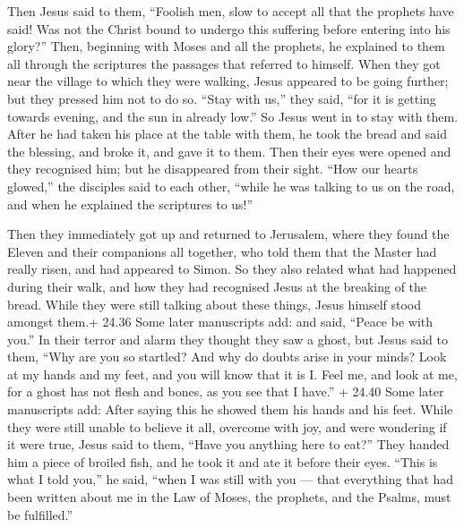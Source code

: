  Then Jesus said to them, ``Foolish men, slow to accept all
that the prophets have said!  Was not the Christ bound to
undergo this suffering before entering into his glory?'' 
Then, beginning with Moses and all the prophets, he explained to them
all through the scriptures the passages that referred to himself.
 When they got near the village to which they were walking,
Jesus appeared to be going further;  but they pressed him
not to do so. ``Stay with us,'' they said, ``for it is getting towards
evening, and the sun in already low.'' So Jesus went in to stay with
them.  After he had taken his place at the table with them,
he took the bread and said the blessing, and broke it, and gave it to
them.  Then their eyes were opened and they recognised him;
but he disappeared from their sight.  ``How our hearts
glowed,'' the disciples said to each other, ``while he was talking to us
on the road, and when he explained the scriptures to us!''

 Then they immediately got up and returned to Jerusalem,
where they found the Eleven and their companions all together,
 who told them that the Master had really risen, and had
appeared to Simon.  So they also related what had happened
during their walk, and how they had recognised Jesus at the breaking of
the bread.  While they were still talking about these
things, Jesus himself stood amongst them.+ 24.36 Some later manuscripts
add: and said, ``Peace be with you.''  In their terror and
alarm they thought they saw a ghost,  but Jesus said to
them, ``Why are you so startled? And why do doubts arise in your minds?
 Look at my hands and my feet, and you will know that it is
I. Feel me, and look at me, for a ghost has not flesh and bones, as you
see that I have.''  + 24.40 Some later manuscripts add:
After saying this he showed them his hands and his feet. 
While they were still unable to believe it all, overcome with joy, and
were wondering if it were true, Jesus said to them, ``Have you anything
here to eat?''  They handed him a piece of broiled fish,
 and he took it and ate it before their eyes. 
``This is what I told you,'' he said, ``when I was still with you ---
that everything that had been written about me in the Law of Moses, the
prophets, and the Psalms, must be fulfilled.''

